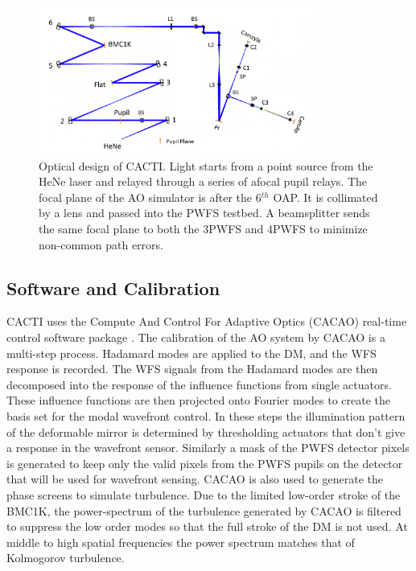 \documentclass[12pt]{spieman}  %
\begin{document}
\begin{spacing}{2}
\begin{figure}
    \centering
    \includegraphics[width=0.8\textwidth]{CACTIzemax.png}
    \caption{Optical design of CACTI. Light starts from a point source from the HeNe laser and relayed through a series of afocal pupil relays. The focal plane of the AO simulator is after the 6${^{th}}$ OAP. It is collimated by a lens and passed into the PWFS testbed. A beamsplitter sends the same focal plane to both the 3PWFS and 4PWFS to minimize non-common path errors.}
    \label{fig:CACTIZemax}
\end{figure}

\subsection{Software and Calibration}

CACTI uses the Compute And Control For Adaptive Optics (CACAO) real-time control software package \cite{guyon2018compute}. The calibration of the AO system by CACAO is a multi-step process. Hadamard modes are applied to the DM, and the WFS response is recorded. The WFS signals from the Hadamard modes are then decomposed into the response of the influence functions from single actuators. These influence functions are then projected onto Fourier modes to create the basis set for the modal wavefront control. In these steps the illumination pattern of the deformable mirror is determined by thresholding actuators that don't give a response in the wavefront sensor. Similarly a mask of the PWFS detector pixels is generated to keep only the valid pixels from the PWFS pupils on the detector that will be used for wavefront sensing. CACAO is also used to generate the phase screens to simulate turbulence. Due to the limited low-order stroke of the BMC1K, the power-spectrum of the turbulence generated by CACAO is filtered to suppress the low order modes so that the full stroke of the DM is not used. At middle to high spatial frequencies the power spectrum matches that of Kolmogorov turbulence. 



\end{spacing}
\end{document}
